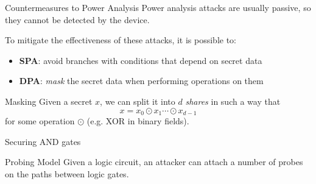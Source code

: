 \begin{frame}{Countermeasures to Power Analysis}
    Power analysis attacks are usually passive, so they cannot be detected by the device.
    \begin{block}{}
        To mitigate the effectiveness of these attacks, it is possible to:
        \begin{itemize}
            \item \textbf{SPA}: avoid branches with conditions that depend on secret data
            \item \textbf{DPA}: \textit{mask} the secret data when performing operations on them
        \end{itemize}
    \end{block}
    \begin{block}{Masking}
        Given a secret $x$, we can split it into $d$ \textit{shares} in such a way that
        \begin{equation*}
            x = x_0 \odot x_1 \cdots \odot x_{d-1}
        \end{equation*}
        for some operation $\odot$ (e.g. XOR in binary fields).
    \end{block}
\end{frame}

\begin{frame}{Securing AND gates}
    \begin{block}{Probing Model}
        Given a logic circuit, an attacker can attach a number of probes on the paths between logic gates.
        
    \end{block}

\end{frame}